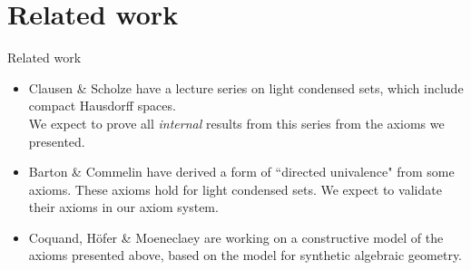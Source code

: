 \documentclass{beamer}
\begin{document}
\section{Related work}
\begin{frame}{Related work}
  \begin{itemize}
    \item 
    Clausen \& Scholze have a lecture series on light condensed sets, which include compact Hausdorff spaces. \\
    \pause
    We expect to prove all \textit{internal} 
    results from this series from the axioms we presented. 
  \pause 
    \item 
      Barton \& Commelin have derived a form of ``directed univalence" from some axioms. \pause
      These axioms hold for light condensed sets. \pause
      We expect to validate their axioms in our axiom system. 
      \pause
    \item 
    Coquand, H\"ofer \& Moeneclaey are working on a 
    constructive model of the axioms presented above, 
    based on the model for synthetic algebraic geometry. 
\end{itemize}
\end{frame}

\end{document}
